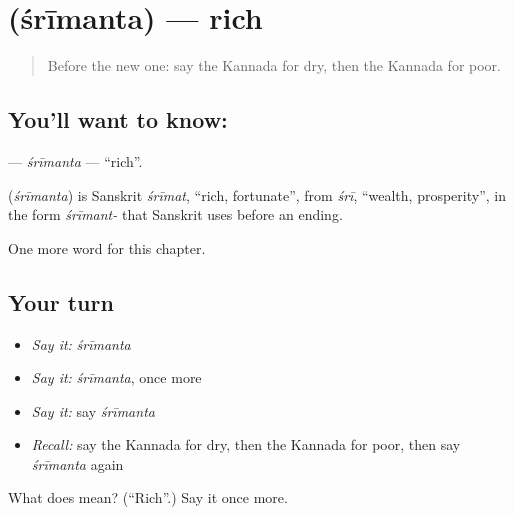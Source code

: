 \section[\texorpdfstring{\kn{ಶ್ರೀಮಂತ} (śrīmanta)}{ಶ್ರೀಮಂತ (śrīmanta)}]{ (śrīmanta) — rich}

\label{lesson:KA-C143-srimanta}



\begin{quote}
Before the new one: say the Kannada for dry, then the Kannada for poor.
\end{quote}

\subsection*{You'll want to know: }
\textbf{} — \emph{śrīmanta} — \textquotedblleft{}rich\textquotedblright{}.

\begin{cousinweb}
\textbf{} (\emph{śrīmanta}) is Sanskrit \emph{śrīmat}, \textquotedblleft{}rich, fortunate\textquotedblright{}, from \emph{śrī}, \textquotedblleft{}wealth, prosperity\textquotedblright{}, in the form \emph{śrīmant-} that Sanskrit uses before an ending.
\end{cousinweb}

\begin{grammarlens}[title={What you've built}]
One more word for this chapter.
\end{grammarlens}

\subsection*{Your turn}
\begin{itemize}
\raggedright
  \item \emph{Say it:} \emph{śrīmanta}
  \item \emph{Say it:} \emph{śrīmanta}, once more
  \item \emph{Say it:} say \emph{śrīmanta}
  \item \emph{Recall:} say the Kannada for dry, then the Kannada for poor, then say \emph{śrīmanta} again
\end{itemize}

\begin{tcolorbox}[breakable,colback=teal!4,colframe=teal!35!black,title={Before you move on}]
What does  mean? (\textquotedblleft{}Rich\textquotedblright{}.) Say it once more.
\end{tcolorbox}
